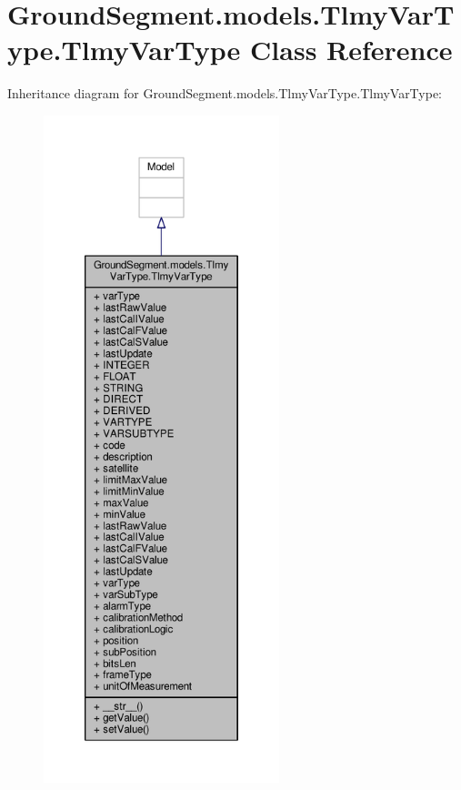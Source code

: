 \hypertarget{class_ground_segment_1_1models_1_1_tlmy_var_type_1_1_tlmy_var_type}{}\section{Ground\+Segment.\+models.\+Tlmy\+Var\+Type.\+Tlmy\+Var\+Type Class Reference}
\label{class_ground_segment_1_1models_1_1_tlmy_var_type_1_1_tlmy_var_type}


Inheritance diagram for Ground\+Segment.\+models.\+Tlmy\+Var\+Type.\+Tlmy\+Var\+Type\+:\nopagebreak
\begin{figure}[H]
\begin{center}
\leavevmode
\includegraphics[height=550pt]{class_ground_segment_1_1models_1_1_tlmy_var_type_1_1_tlmy_var_type__inherit__graph}
\end{center}
\end{figure}


